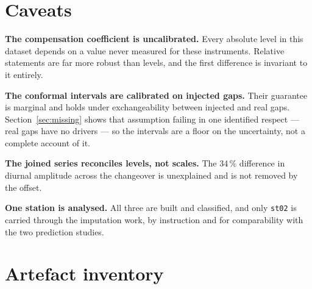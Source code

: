 \documentclass[11pt,a4paper]{article}
\begin{document}

\section{Caveats}

\textbf{The compensation coefficient is uncalibrated.} Every absolute level in
this dataset depends on a value never measured for these instruments. Relative
statements are far more robust than levels, and the first difference is
invariant to it entirely.

\textbf{The conformal intervals are calibrated on injected gaps.} Their
guarantee is marginal and holds under exchangeability between injected and real
gaps. Section~\ref{sec:missing} shows that assumption failing in one identified
respect --- real gaps have no drivers --- so the intervals are a floor on the
uncertainty, not a complete account of it.

\textbf{The joined series reconciles levels, not scales.} The 34\,\% difference
in diurnal amplitude across the changeover is unexplained and is not removed by
the offset.

\textbf{One station is analysed.} All three are built and classified, and only
\texttt{st02} is carried through the imputation work, by instruction and for
comparability with the two prediction studies.

\section{Artefact inventory}
\end{document}
